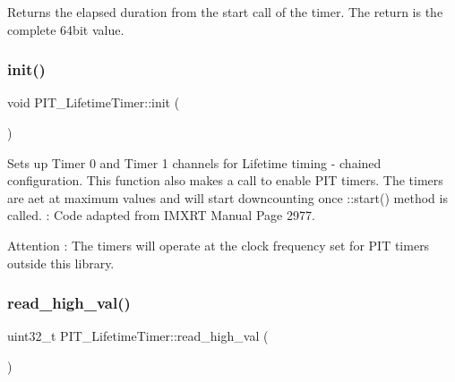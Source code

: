 Returns the elapsed duration from the start call of the timer. The return is the complete 64bit value. 

\mbox{\label{classPIT__LifetimeTimer_ad1c585d138123be94769afcca87f2dc6}} 
\subsubsection{\texorpdfstring{init()}{init()}}
{\footnotesize\ttfamily void P\+I\+T\+\_\+\+Lifetime\+Timer\+::init (\begin{DoxyParamCaption}{ }\end{DoxyParamCaption})\hspace{0.3cm}{\ttfamily [inline]}}



Sets up Timer 0 and Timer 1 channels for Lifetime timing -\/ chained configuration. This function also makes a call to enable P\+IT timers. The timers are aet at maximum values and will start downcounting once \+::start() method is called.  \+: Code adapted from I\+M\+X\+RT Manual Page 2977. 

\begin{DoxyAttention}{Attention}
\+: The timers will operate at the clock frequency set for P\+IT timers outside this library. 
\end{DoxyAttention}
\mbox{\label{classPIT__LifetimeTimer_a39b0861ac88aec5e53f326409d536bcf}} 
\subsubsection{\texorpdfstring{read\+\_\+high\+\_\+val()}{read\_high\_val()}}
{\footnotesize\ttfamily uint32\+\_\+t P\+I\+T\+\_\+\+Lifetime\+Timer\+::read\+\_\+high\+\_\+val (\begin{DoxyParamCaption}{ }\end{DoxyParamCaption})\hspace{0.3cm}{\ttfamily [inline]}}



